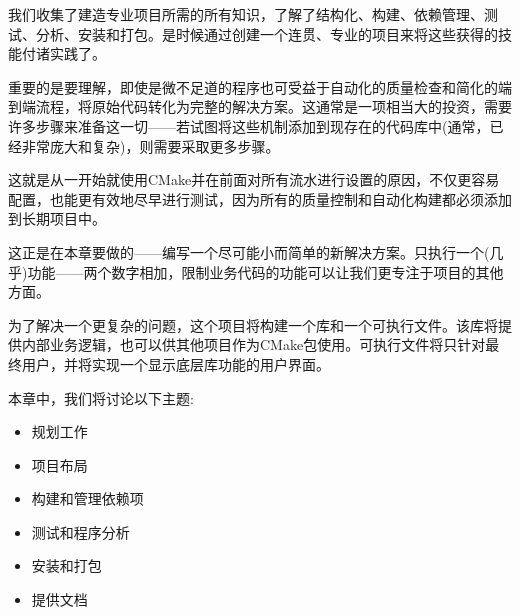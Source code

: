 
我们收集了建造专业项目所需的所有知识，了解了结构化、构建、依赖管理、测试、分析、安装和打包。是时候通过创建一个连贯、专业的项目来将这些获得的技能付诸实践了。

重要的是要理解，即使是微不足道的程序也可受益于自动化的质量检查和简化的端到端流程，将原始代码转化为完整的解决方案。这通常是一项相当大的投资，需要许多步骤来准备这一切——若试图将这些机制添加到现存在的代码库中(通常，已经非常庞大和复杂)，则需要采取更多步骤。

这就是从一开始就使用CMake并在前面对所有流水进行设置的原因，不仅更容易配置，也能更有效地尽早进行测试，因为所有的质量控制和自动化构建都必须添加到长期项目中。

这正是在本章要做的——编写一个尽可能小而简单的新解决方案。只执行一个(几乎)功能——两个数字相加，限制业务代码的功能可以让我们更专注于项目的其他方面。

为了解决一个更复杂的问题，这个项目将构建一个库和一个可执行文件。该库将提供内部业务逻辑，也可以供其他项目作为CMake包使用。可执行文件将只针对最终用户，并将实现一个显示底层库功能的用户界面。

本章中，我们将讨论以下主题:

\begin{itemize}
\item 
规划工作

\item 
项目布局

\item 
构建和管理依赖项

\item 
测试和程序分析

\item 
安装和打包

\item 
提供文档
\end{itemize}